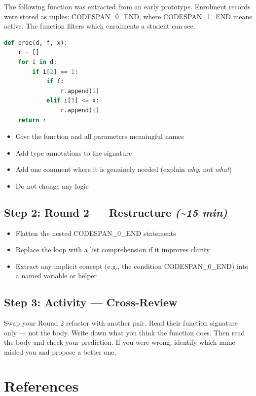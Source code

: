 \documentclass[11pt,a4paper]{book}
\begin{document}
The following function was extracted from an early prototype. Enrolment records were stored as tuples: CODESPAN\_0\_END, where CODESPAN\_1\_END means active. The function filters which enrolments a student can see.

\begin{lstlisting}[language=Python]
def proc(d, f, x):
    r = []
    for i in d:
        if i[2] == 1:
            if f:
                r.append(i)
            elif i[3] <= x:
                r.append(i)
    return r
\end{lstlisting}

\begin{itemize}
  \item Give the function and all parameters meaningful names
  \item Add type annotations to the signature
  \item Add one comment where it is genuinely needed (explain \textit{why}, not \textit{what})
  \item Do not change any logic
\end{itemize}

\subsection{Step 2: Round 2 --- Restructure \textit{(\textasciitilde{}15 min)}}

\begin{itemize}
  \item Flatten the nested CODESPAN\_0\_END statements
  \item Replace the loop with a list comprehension if it improves clarity
  \item Extract any implicit concept (e.g., the condition CODESPAN\_0\_END) into a named variable or helper
\end{itemize}

\subsection{Step 3: Activity --- Cross-Review}

Swap your Round 2 refactor with another pair. Read their function signature only --- not the body. Write down what you think the function does. Then read the body and check your prediction. If you were wrong, identify which name misled you and propose a better one.

\medskip

\section{References}
\end{document}
